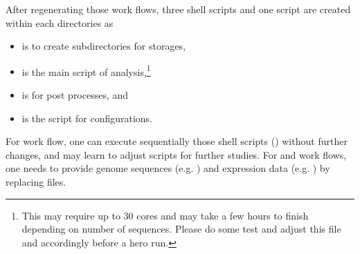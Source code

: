 After regenerating those work flows,
three shell scripts and one  script are created
within each directories as
\begin{itemize}
\item {} is to create subdirectories for storages,
\item {} is the main script of analysis,\footnote{
This may require up to 30 cores and may take a few hours to finish
depending on number of sequences. Please do some test and adjust
this file and  accordingly before a hero run.
}
\item {} is for post processes, and
\item {} is the  script for configurations.
\end{itemize}
For  work flow, one can execute sequentially those shell scripts
()
without further changes, and may learn to adjust scripts for further studies.
For  and  work flows, one needs to provide genome
sequences (e.g. )
and expression data (e.g. )
by replacing files.

